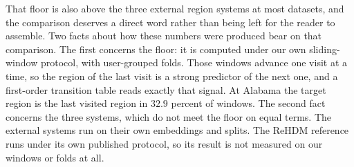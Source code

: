 That floor is also above the three external region systems at most datasets, and the
comparison deserves a direct word rather than being left for the reader to assemble.
Two
facts about how these numbers were produced bear on that comparison. The first concerns
the floor: it is computed under our own sliding-window protocol, with user-grouped folds. Those
windows advance one visit at a time, so the region of the last visit is a strong predictor
of the next one, and a first-order transition table reads exactly that signal. At Alabama the target region is the last visited region in $32.9$ percent of
windows.
The second
fact concerns the three systems, which do not meet the floor on equal terms. The external
systems run on their own embeddings and splits. The
ReHDM reference runs under its own published protocol, so its result is not measured on our
windows or folds at all.

